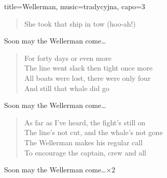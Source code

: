 \begin{song}{title={Wellerman}, music={tradycyjna}, capo=3}
\begin{multicols}{2}
\begin{verse}
        She took that ship in tow (hoo-ah!)
    \end{verse}
    \begin{chorus}
        Soon may the Wellerman come\ldots
    \end{chorus}
    \begin{verse}
        For forty days or even more \\
        The line went slack then tight once more \\
        All boats were lost, there were only four \\
        And still that whale did go
    \end{verse}
    \begin{chorus}
        Soon may the Wellerman come\ldots
    \end{chorus}
    \begin{verse}
        As far as I've heard, the fight's still on \\
        The line's not cut, and the whale's not gone \\
        The Wellerman makes his regular call \\
        To encourage the captain, crew and all
    \end{verse}
    \begin{chorus}
        Soon may the Wellerman come\ldots $\times 2$
    \end{chorus}
\end{multicols}
\end{song}

